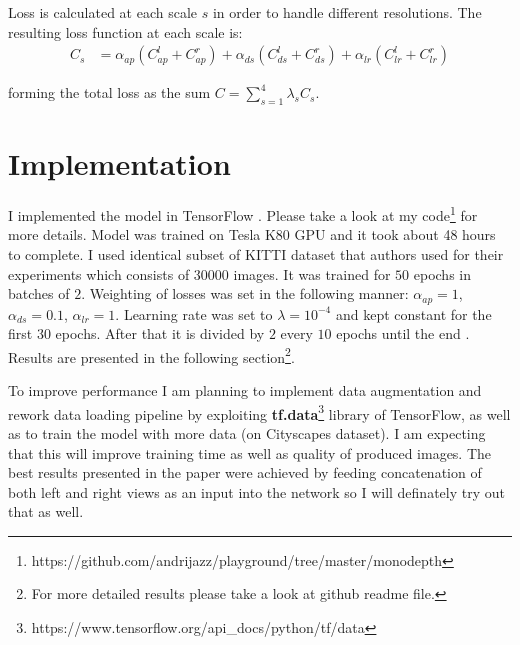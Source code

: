 \documentclass{article}
\begin{document}
Loss is calculated at each scale $s$ in order to handle different resolutions. The resulting loss function at each scale is:
\begin{align*}
	C_s &= \alpha_{ap}(C_{ap}^{l} + C_{ap}^{r}) + \alpha_{ds}(C_{ds}^{l} + C_{ds}^{r}) +
\alpha_{lr}(C_{lr}^{l} + C_{lr}^{r})
\end{align*}

forming the total loss as the sum  $C = \sum_{s=1}^{4}\lambda_sC_s$.


\section{Implementation}
   
I implemented the model in TensorFlow \cite{DBLP:journals/corr/AbadiABBCCCDDDG16}. Please take a look at my code\footnote{https://github.com/andrijazz/playground/tree/master/monodepth} for more details. Model was trained on Tesla K80 GPU and it took about 48 hours to complete. I used identical subset of KITTI \cite{Menze2018JPRS} dataset that authors used for their experiments which consists of $30000$ images. It was trained for $50$ epochs in batches of $2$. Weighting of losses was set in the following manner: $\alpha_{ap} = 1$, $\alpha_{ds} = 0.1$, $\alpha_{lr} = 1$. Learning rate was set to $\lambda = 10^{-4}$ and kept constant for the first $30$ epochs. After that it is divided by $2$ every $10$ epochs until the end \cite{DBLP:journals/corr/GodardAB16}. Results are presented in the following section\footnote{For more detailed results please take a look at github readme file.}.

To improve performance I am planning to implement data augmentation and rework data loading pipeline by exploiting \textbf{tf.data}\footnote{https://www.tensorflow.org/api\_docs/python/tf/data} library of TensorFlow, as well as to train the model with more data (on Cityscapes dataset\cite{DBLP:journals/corr/CordtsORREBFRS16}). I am expecting that this will improve training time as well as quality of produced images. The best results presented in the paper were achieved by feeding concatenation of both left and right views as an input into the network so I will definately try out that as well.

\end{document}
